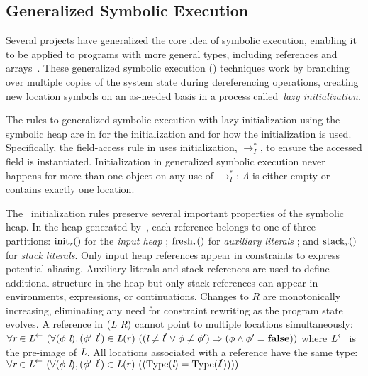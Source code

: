 \subsection{Generalized Symbolic Execution}
\label{app:gse}
Several projects have generalized the core idea of symbolic execution,
enabling it to be applied to programs with more general types,
including references and
arrays~\cite{GSE03,KiasanKunit,Cadar:2008,Rosner:2015}. These
generalized symbolic execution (\gsetxt{}) techniques work by branching over
multiple copies of the system state during dereferencing operations, creating
new location symbols on an as-needed basis in a process called~\emph{lazy initialization}.

The rules to generalized symbolic execution with
lazy initialization using the symbolic heap are in
 for the initialization and  for
how the initialization is used. Specifically, the field-access rule in
 uses initialization, $\rightarrow_I^*$, to ensure
the accessed field is instantiated. Initialization in generalized
symbolic execution never happens for more than one object on any use
of $\rightarrow_I^*$: $\Lambda$ is either empty or contains exactly
one location.

The~\gsetxt{} initialization rules preserve several important properties of the symbolic heap. In the heap generated by~\gsetxt{}, each reference belongs to one of three partitions: $\mathrm{init}_{\emph{r}}()$ for the \emph{input
  heap}
  ; $\mathrm{fresh}_{\emph{r}}()$ for \emph{auxiliary
  literals}
  ; and $\mathrm{stack}_{\emph{r}}()$ for \emph{stack
  literals}.
  Only input heap references appear in constraints to express potential aliasing.
  Auxiliary literals and stack references are used to define additional structure in the heap but only stack references can appear in environments, expressions, or continuations. Changes to $R$ are monotonically increasing, eliminating any need for constraint rewriting as the program state evolves.
A reference in $(\emph{L}\ \emph{R})$ cannot point to multiple locations simultaneously: 
$
\forall \cfgnt{r} \in \cfgnt{L}^\leftarrow\ (\forall (\phi\ \cfgnt{l}),(\phi^\prime\ \cfgnt{l}^\prime) \in \cfgnt{L}(r)\ (
(\cfgnt{l} \neq \cfgnt{l}^\prime \vee \phi \neq \phi^\prime) \Rightarrow (\phi \wedge \phi^\prime = \cfgt{false}))
$
where $\emph{L}^\leftarrow$ is the pre-image of $\emph{L}$. 
All locations associated with a reference have the same type:
$\forall \cfgnt{r} \in \cfgnt{L}^\leftarrow\ (\forall (\phi\ \cfgnt{l}),(\phi^\prime\ \cfgnt{l}^\prime) \in \cfgnt{L}(r)\ (
(\mathrm{Type}\lp\cfgnt{l}\rp = \mathrm{Type}\lp\cfgnt{l}^\prime\rp)))$

